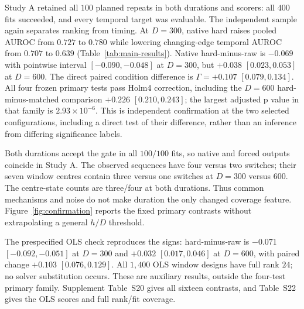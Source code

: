 Study A retained all $100$ planned repeats in both durations and scorers:
all $400$ fits succeeded, and every temporal target was evaluable.
The independent sample again separates ranking from timing. At $D=300$, native
hard raises pooled AUROC from $0.727$ to $0.780$ while lowering changing-edge
temporal AUROC from $0.707$ to $0.639$ (Table~\ref{tab:main-results}).
Native hard-minus-raw is $-0.069$ with pointwise interval
$[-0.090,-0.048]$ at $D=300$, but $+0.038$ $[0.023,0.053]$ at $D=600$.
The direct paired condition difference is $\Gamma=+0.107$
$[0.079,0.134]$. All four frozen primary tests pass Holm4 correction, including
the $D=600$ hard-minus-matched comparison $+0.226$ $[0.210,0.243]$;
the largest adjusted p value in that family is $2.93\times10^{-6}$.
This is independent confirmation at the two selected configurations, including
a direct test of their difference, rather than an inference from differing
significance labels.

Both durations accept the gate in all $100/100$ fits, so native and forced
outputs coincide in Study A. The observed sequences have four versus two
switches; their seven window centres contain three versus one switches at
$D=300$ versus $600$. The centre-state counts are three/four at both durations.
Thus common mechanisms and noise do not make duration the only changed
coverage feature. Figure~\ref{fig:confirmation} reports the fixed primary
contrasts without extrapolating a general $h/D$ threshold.

The prespecified OLS check reproduces the signs: hard-minus-raw is
$-0.071$ $[-0.092,-0.051]$ at $D=300$ and
$+0.032$ $[0.017,0.046]$ at $D=600$, with paired change
$+0.103$ $[0.076,0.129]$. All $1,400$ OLS window designs have
full rank $24$; no solver substitution occurs. These are auxiliary results,
outside the four-test primary family. Supplement Table~S20 gives all sixteen
contrasts, and Table~S22 gives the OLS scores and full rank/fit coverage.
